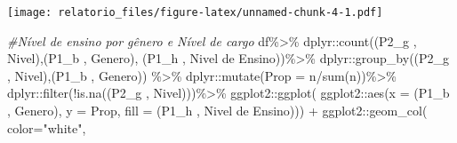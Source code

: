 \documentclass[
]{article}
\newenvironment{Shaded}{\begin{snugshade}}{\end{snugshade}}
\newcommand{\AttributeTok}[1]{\textcolor[rgb]{0.77,0.63,0.00}{#1}}
\newcommand{\CommentTok}[1]{\textcolor[rgb]{0.56,0.35,0.01}{\textit{#1}}}
\newcommand{\FunctionTok}[1]{\textcolor[rgb]{0.00,0.00,0.00}{#1}}
\newcommand{\NormalTok}[1]{#1}
\newcommand{\SpecialCharTok}[1]{\textcolor[rgb]{0.00,0.00,0.00}{#1}}
\newcommand{\StringTok}[1]{\textcolor[rgb]{0.31,0.60,0.02}{#1}}
\begin{document}
\texttt{[image: relatorio\_files/figure-latex/unnamed-chunk-4-1.pdf]}

\begin{Shaded}
\begin{Highlighting}[]
\CommentTok{\#Nível de ensino por gênero e Nível de cargo}
\NormalTok{df}\SpecialCharTok{\%\textgreater{}\%}
\NormalTok{  dplyr}\SpecialCharTok{::}\FunctionTok{count}\NormalTok{(}\StringTok{\textasciigrave{}}\AttributeTok{(\textquotesingle{}P2\_g \textquotesingle{}, \textquotesingle{}Nivel\textquotesingle{})}\StringTok{\textasciigrave{}}\NormalTok{,}\StringTok{\textasciigrave{}}\AttributeTok{(\textquotesingle{}P1\_b \textquotesingle{}, \textquotesingle{}Genero\textquotesingle{})}\StringTok{\textasciigrave{}}\NormalTok{, }\StringTok{\textasciigrave{}}\AttributeTok{(\textquotesingle{}P1\_h \textquotesingle{}, \textquotesingle{}Nivel de Ensino\textquotesingle{})}\StringTok{\textasciigrave{}}\NormalTok{)}\SpecialCharTok{\%\textgreater{}\%}
\NormalTok{  dplyr}\SpecialCharTok{::}\FunctionTok{group\_by}\NormalTok{(}\StringTok{\textasciigrave{}}\AttributeTok{(\textquotesingle{}P2\_g \textquotesingle{}, \textquotesingle{}Nivel\textquotesingle{})}\StringTok{\textasciigrave{}}\NormalTok{,}\StringTok{\textasciigrave{}}\AttributeTok{(\textquotesingle{}P1\_b \textquotesingle{}, \textquotesingle{}Genero\textquotesingle{})}\StringTok{\textasciigrave{}}\NormalTok{) }\SpecialCharTok{\%\textgreater{}\%}
\NormalTok{  dplyr}\SpecialCharTok{::}\FunctionTok{mutate}\NormalTok{(}\AttributeTok{Prop =}\NormalTok{ n}\SpecialCharTok{/}\FunctionTok{sum}\NormalTok{(n))}\SpecialCharTok{\%\textgreater{}\%}
\NormalTok{  dplyr}\SpecialCharTok{::}\FunctionTok{filter}\NormalTok{(}\SpecialCharTok{!}\FunctionTok{is.na}\NormalTok{(}\StringTok{\textasciigrave{}}\AttributeTok{(\textquotesingle{}P2\_g \textquotesingle{}, \textquotesingle{}Nivel\textquotesingle{})}\StringTok{\textasciigrave{}}\NormalTok{))}\SpecialCharTok{\%\textgreater{}\%}
\NormalTok{  ggplot2}\SpecialCharTok{::}\FunctionTok{ggplot}\NormalTok{(}
\NormalTok{    ggplot2}\SpecialCharTok{::}\FunctionTok{aes}\NormalTok{(}\AttributeTok{x =} \StringTok{\textasciigrave{}}\AttributeTok{(\textquotesingle{}P1\_b \textquotesingle{}, \textquotesingle{}Genero\textquotesingle{})}\StringTok{\textasciigrave{}}\NormalTok{, }\AttributeTok{y =}\NormalTok{ Prop,}
                 \AttributeTok{fill =} \StringTok{\textasciigrave{}}\AttributeTok{(\textquotesingle{}P1\_h \textquotesingle{}, \textquotesingle{}Nivel de Ensino\textquotesingle{})}\StringTok{\textasciigrave{}}\NormalTok{)) }\SpecialCharTok{+}
\NormalTok{  ggplot2}\SpecialCharTok{::}\FunctionTok{geom\_col}\NormalTok{( }\AttributeTok{color=}\StringTok{"white"}\NormalTok{,}

\end{Highlighting}
\end{Shaded}
\end{document}
